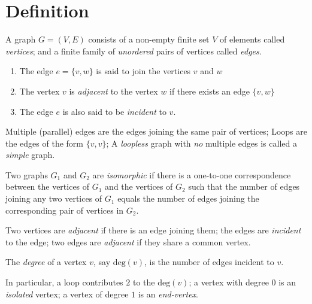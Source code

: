\chapter{Definition}

\begin{definition}[Graph]
A graph $G=(V,E)$ consists of a non-empty finite set $V$ of elements called \emph{vertices};
and a finite family of \emph{unordered} pairs of vertices called \emph{edges}.
\begin{enumerate}
\item
The edge $e=\{v,w\}$ is said to join the vertices $v$ and $w$
\item
The vertex $v$ is \emph{adjacent} to the vertex $w$ if there exists an edge $\{v,w\}$
\item
The edge $e$ is also said to be \emph{incident} to $v$.
\end{enumerate}
\end{definition}

\begin{definition}[Simple]
Multiple (parallel) edges are the edges joining the same pair of vertices;
Loops are the edges of the form $\{v,v\}$;
A \emph{loopless} graph with \emph{no} multiple edges is called a \emph{simple} graph.
\end{definition}

\begin{definition}[Isomorphism]
Two graphs $G_1$ and $G_2$ are \emph{isomorphic} if
there is a one-to-one correspondence between the vertices of $G_1$ and the vertices of $G_2$
such that
the number of edges joining any two vertices of $G_1$ equals the number of edges joining the corresponding pair of vertices in $G_2$.
\end{definition}

\begin{definition}
Two vertices are \emph{adjacent} if there is an edge joining them;
the edges are \emph{incident} to the edge;
two edges are \emph{adjacent} if they share a common vertex.
\end{definition}

\begin{definition}
The \emph{degree} of a vertex $v$, say $\text{deg}(v)$, is the number of edges incident to $v$.
\end{definition}

In particular, a loop contributes $2$ to the $\text{deg}(v)$;
a vertex with degree $0$ is an \emph{isolated} vertex;
a vertex of degree $1$ is an \emph{end-vertex}.

